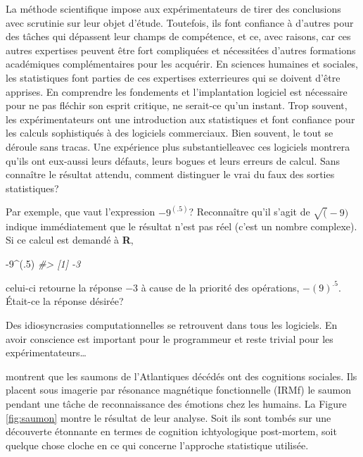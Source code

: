 \documentclass[
]{book}
\newenvironment{Shaded}{}{}
\newcommand{\CommentTok}[1]{\textit{#1}}
\newcommand{\DecValTok}[1]{#1}
\newcommand{\NormalTok}[1]{#1}
\newcommand{\SpecialCharTok}[1]{#1}
\begin{document}
La méthode scientifique impose aux expérimentateurs de tirer des conclusions avec scrutinie sur leur objet d'étude. Toutefois, ils font confiance à d'autres pour des tâches qui dépassent leur champs de compétence, et ce, avec raisons, car ces autres expertises peuvent être fort compliquées et nécessitées d'autres formations académiques complémentaires pour les acquérir. En sciences humaines et sociales, les statistiques font parties de ces expertises exterrieures qui se doivent d'être apprises. En comprendre les fondements et l'implantation logiciel est nécessaire pour ne pas fléchir son esprit critique, ne serait-ce qu'un instant. Trop souvent, les expérimentateurs ont une introduction aux statistiques et font confiance pour les calculs sophistiqués à des logiciels commerciaux. Bien souvent, le tout se déroule sans tracas. Une expérience plus substantielleavec ces logiciels montrera qu'ils ont eux-aussi leurs défauts, leurs bogues et leurs erreurs de calcul. Sans connaître le résultat attendu, comment distinguer le vrai du faux des sorties statistiques?

Par exemple, que vaut l'expression \(-9^{(.5)}\)? Reconnaître qu'il s'agit de \(\sqrt(-9)\) indique immédiatement que le résultat n'est pas réel (c'est un nombre complexe). Si ce calcul est demandé à \textbf{R},

\begin{Shaded}
\begin{Highlighting}[]
\SpecialCharTok{{-}}\DecValTok{9}\SpecialCharTok{\^{}}\NormalTok{(.}\DecValTok{5}\NormalTok{)}
\CommentTok{\#\textgreater{} [1] {-}3}
\end{Highlighting}
\end{Shaded}

celui-ci retourne la réponse \(-3\) à cause de la priorité des opérations, \(-(9)^{.5}\). Était-ce la réponse désirée?

Des idiosyncrasies computationnelles se retrouvent dans tous les logiciels. En avoir conscience est important pour le programmeur et reste trivial pour les expérimentateurs\ldots{}

\textcite{Bennett10} montrent que les saumons de l'Atlantiques décédés ont des cognitions sociales. Ils placent sous imagerie par résonance magnétique fonctionnelle (IRMf) le saumon pendant une tâche de reconnaissance des émotions chez les humains. La Figure \ref{fig:saumon} montre le résultat de leur analyse. Soit ils sont tombés sur une découverte étonnante en termes de cognition ichtyologique post-mortem, soit quelque chose cloche en ce qui concerne l'approche statistique utilisée.
\end{document}
